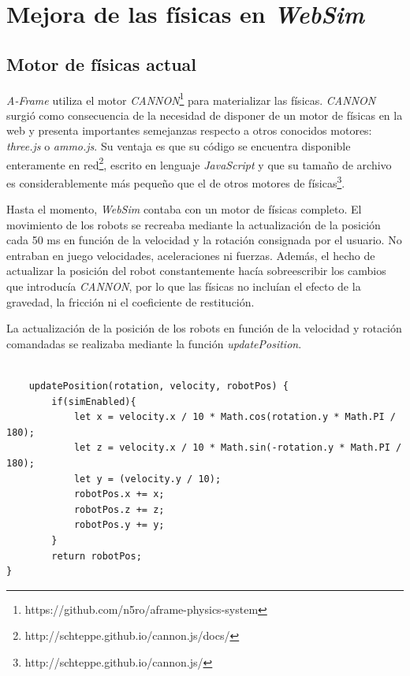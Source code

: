 \chapter{Mejora de las físicas en \textit{WebSim}}
\label{chap:motor_fisicas} 

\section{Motor de físicas actual}
\textit{A-Frame} utiliza el motor  \textit{CANNON}\footnote{https://github.com/n5ro/aframe-physics-system} para materializar las físicas. \textit{CANNON} surgió como consecuencia de la necesidad de disponer de un motor de físicas en la web y presenta importantes semejanzas respecto a otros conocidos motores: \textit{three.js} o \textit{ammo.js}. Su ventaja es que su código se encuentra disponible enteramente en red\footnote{http://schteppe.github.io/cannon.js/docs/}, escrito en lenguaje \textit{JavaScript} y que su tamaño de archivo es considerablemente más pequeño que el de otros motores de físicas\footnote{http://schteppe.github.io/cannon.js/}.\newline

Hasta el momento, \textit{WebSim} contaba con un motor de físicas completo. El movimiento de los robots se recreaba mediante la actualización de la posición cada 50 ms en función de la velocidad y la rotación consignada por el usuario. No entraban en juego velocidades, aceleraciones ni fuerzas. Además, el hecho de actualizar la posición del robot constantemente hacía sobreescribir los cambios que introducía \textit{CANNON}, por lo que las físicas no incluían el efecto de la gravedad, la fricción ni el coeficiente de restitución. \newline 

La actualización de la posición de los robots en función de la velocidad y rotación comandadas se realizaba mediante la función \textit{updatePosition}.

\small{
\begin{verbatim} 

    updatePosition(rotation, velocity, robotPos) {
        if(simEnabled){
            let x = velocity.x / 10 * Math.cos(rotation.y * Math.PI / 180);
            let z = velocity.x / 10 * Math.sin(-rotation.y * Math.PI / 180);
            let y = (velocity.y / 10);
            robotPos.x += x;
            robotPos.z += z;
            robotPos.y += y;
        }
        return robotPos;
}
\end{verbatim}
}

